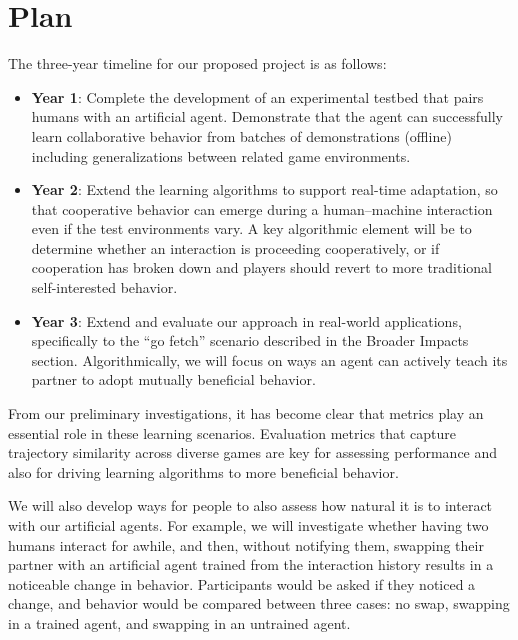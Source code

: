 
\section{Plan}
The three-year timeline for our proposed project is as follows:

\begin{itemize}
\item {\bf Year 1}: Complete the development of an experimental
  testbed that pairs humans with an artificial agent.  Demonstrate
  that the agent can successfully learn collaborative behavior from
  batches of demonstrations (offline) including generalizations
  between related game environments.

\item {\bf Year 2}: Extend the learning algorithms to support
  real-time adaptation, so that cooperative behavior can emerge during
  a human--machine interaction even if the test environments vary. A
  key algorithmic element will be to determine whether an interaction
  is proceeding cooperatively, or if cooperation has broken down and
  players should revert to more traditional self-interested behavior. 


\item {\bf Year 3}: Extend and evaluate our approach in real-world
  applications, specifically to the ``go fetch'' scenario described in
  the Broader Impacts section. Algorithmically, we will focus on ways
  an agent can actively teach its partner to adopt mutually beneficial
  behavior. 

\end{itemize}

From our preliminary investigations, it has become clear that metrics
play an essential role in these learning scenarios.  Evaluation
metrics that capture trajectory similarity across diverse games are
key for assessing performance and also for driving learning algorithms
to more beneficial behavior. 

We will also develop ways for people to also assess how natural it is
to interact with our artificial agents. For example, we will
investigate whether having two humans interact for awhile, and then,
without notifying them, swapping their partner with an artificial
agent trained from the interaction history results in a noticeable
change in behavior. Participants would be asked if they noticed a
change, and behavior would be compared between three cases: no swap,
swapping in a trained agent, and swapping in an untrained agent.

